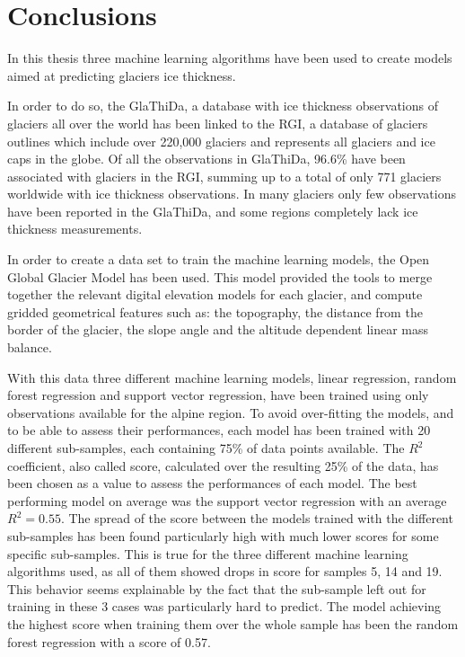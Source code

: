 \chapter{Conclusions}\label{concl}
\thispagestyle{plain}

In this thesis three machine learning algorithms have been used to create models aimed at predicting glaciers ice thickness.

In order to do so, the GlaThiDa, a database with ice thickness observations of glaciers all over the world has been linked to the RGI, a database of glaciers outlines which include over 220,000 glaciers and represents all glaciers and ice caps in the globe. Of all the observations in GlaThiDa, 96.6\% have been associated with glaciers in the RGI, summing up to a total of only 771 glaciers worldwide with ice thickness observations. In many glaciers only few observations have been reported in the GlaThiDa, and some regions completely lack ice thickness measurements.

In order to create a data set to train the machine learning models, the Open Global Glacier Model has been used. This model provided the tools to merge together the relevant digital elevation models for each glacier, and compute gridded geometrical features such as: the topography, the distance from the border of the glacier, the slope angle and the altitude dependent linear mass balance.

With this data three different machine learning models, linear regression, random forest regression and support vector regression, have been trained using only observations available for the alpine region. To avoid over-fitting the models, and to be able to assess their performances, each model has been trained with 20 different sub-samples, each containing 75\% of data points available. The $R^2$ coefficient, also called score, calculated over the resulting 25\% of the data, has been chosen as a value to assess the performances of each model. The best performing model on average was the support vector regression with an average $R^2 = 0.55$. The spread of the score between the models trained with the different sub-samples has been found particularly high with much lower scores for some specific sub-samples. This is true for the three different machine learning algorithms used, as all of them showed drops in score for samples 5, 14 and 19. This behavior seems explainable by the fact that the sub-sample left out for training in these 3 cases was particularly hard to predict.
The model achieving the highest score when training them over the whole sample has been the random forest regression with a score of 0.57.

